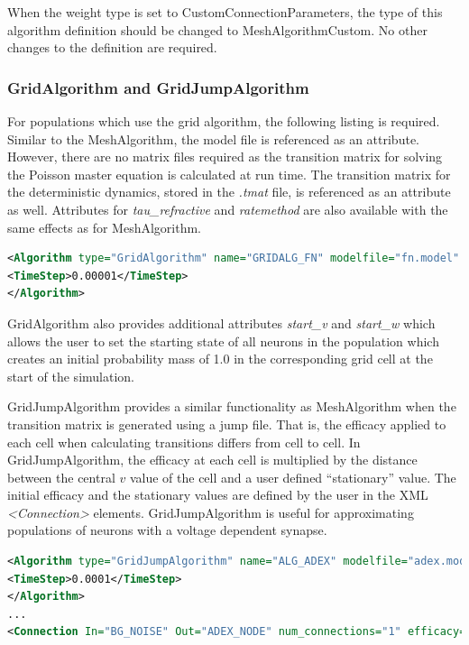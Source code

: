 \documentclass[utf8]{frontiersSCNS} %
\begin{document}
When the weight type is set to CustomConnectionParameters, the type of this algorithm definition should be changed to MeshAlgorithmCustom. No other changes to the definition are required.\\

\subsubsection{GridAlgorithm and GridJumpAlgorithm}

For populations which use the grid algorithm, the following listing is required. Similar to the MeshAlgorithm, the model file is referenced as an attribute. However, there are no matrix files required as the transition matrix for solving the Poisson master equation is calculated at run time. The transition matrix for the deterministic dynamics, stored in the \textit{.tmat} file, is referenced as an attribute as well. Attributes for \textit{tau\_refractive} and \textit{ratemethod} are also available with the same effects as for MeshAlgorithm. 

\begin{lstlisting}[language=xml,caption={A GridAlgorithm definition using the AvgV (membrane potential) rate method.}]
<Algorithm type="GridAlgorithm" name="GRIDALG_FN" modelfile="fn.model" tau_refractive="0.0" transformfile="fn_0_0_0_0_.tmat" start_v="-1.0" start_w="-0.3" ratemethod="AvgV">
<TimeStep>0.00001</TimeStep>
</Algorithm>
\end{lstlisting}

GridAlgorithm also provides additional attributes \textit{start\_v} and \textit{start\_w} which allows the user to set the starting state of all neurons in the population which creates an initial probability mass of 1.0 in the corresponding grid cell at the start of the simulation.

GridJumpAlgorithm provides a similar functionality as MeshAlgorithm when the transition matrix is generated using a jump file. That is, the efficacy applied to each cell when calculating transitions differs from cell to cell. In GridJumpAlgorithm, the efficacy at each cell is multiplied by the distance between the central $v$ value of the cell and a user defined ``stationary'' value. The initial efficacy and the stationary values are defined by the user in the XML \textit{\textless Connection\textgreater} elements. GridJumpAlgorithm is useful for approximating populations of neurons with a voltage dependent synapse.

\begin{lstlisting}[language=xml,caption={A GridJumpAlgorithm definition and corresponding Connection with a ``stationary'' attribute. The efficacy at each grid cell will equal the original efficacy value (-0.05) multiplied by the difference between each cell's central v value and the given stationary value (-65)}]
<Algorithm type="GridJumpAlgorithm" name="ALG_ADEX" modelfile="adex.model" tau_refractive="0.0" transformfile="adex_0_0_0_0_.tmat" start_v="-65.0" start_w="0.0">
<TimeStep>0.0001</TimeStep>
</Algorithm>
...
<Connection In="BG_NOISE" Out="ADEX_NODE" num_connections="1" efficacy="-0.05" delay="0.0" stationary="-65.0"/>
\end{lstlisting}
\end{document}
